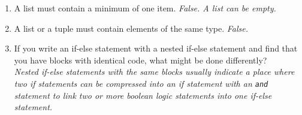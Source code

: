 \documentclass[letter,10pt]{article}
\begin{document}
\begin{enumerate}
    \item A list must contain a minimum of one item. \textit{False. A list can be empty.}

    \item A list or a tuple must contain elements of the same type. \textit{False.}

    \item If you write an if-else statement with a nested if-else statement and find that you have blocks with identical code, what might be done differently? \\ \textit{Nested if-else statements with the same blocks usually indicate a place where two if statements can be compressed into an if statement with an \texttt{and} statement to link two or more boolean logic statements into one if-else statement.}

\end{enumerate}
\end{document}
